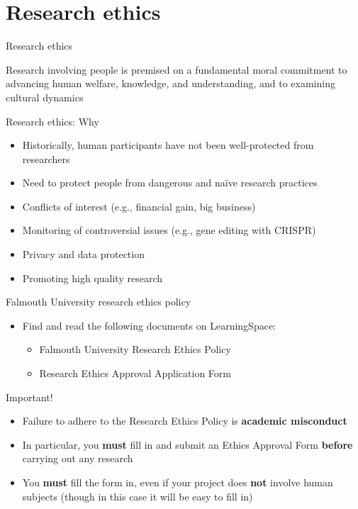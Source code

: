\part{Research ethics}
\frame{\partpage}

\begin{frame}{Research ethics}
	
	Research involving people is premised on a fundamental moral commitment 
	to advancing human welfare, 
	knowledge, and understanding, and to examining cultural dynamics

\end{frame}

\begin{frame}{Research ethics: Why}
	
	\begin{itemize}
		\pause\item Historically, human participants have not been well-protected from researchers
		\pause\item Need to protect people from dangerous and na\"ive research practices
		\pause\item Conflicts of interest (e.g., financial gain, big business)
		\pause\item Monitoring of controversial issues (e.g., gene editing with CRISPR)
		\pause\item Privacy and data protection
		\pause\item Promoting high quality research
	\end{itemize}
\end{frame}

\begin{frame}{Falmouth University research ethics policy}
	\begin{itemize}
		\item Find and read the following documents on LearningSpace:
		\begin{itemize}
			\item Falmouth University Research Ethics Policy
			\item Research Ethics Approval Application Form
		\end{itemize}
	\end{itemize}
\end{frame}

{
\iftoggle{printable}{
}{
	\setbeamercolor{background canvas}{bg=red!50!black}
}
\begin{frame}{Important!}
	\begin{itemize}
		\pause\item Failure to adhere to the Research Ethics Policy is \textbf{academic misconduct}
		\pause\item In particular, you \textbf{must} fill in and submit an Ethics Approval Form
			\textbf{before} carrying out any research
		\pause\item You \textbf{must} fill the form in, even if your project does \textbf{not} involve human subjects
			(though in this case it will be easy to fill in)
	\end{itemize}
\end{frame}
}

